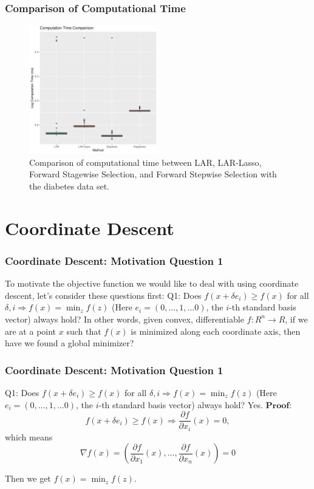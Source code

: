 \begin{frame}
    \frametitle{Comparison of Computational Time}
\begin{figure}[!htbp]
    \begin{center}
        \includegraphics[width=0.5\textwidth]{img/lars_time.pdf}
    \end{center}
    \caption{Comparison of computational time between LAR, LAR-Lasso, Forward Stagewise Selection, and Forward Stepwise Selection with the diabetes data set.}\label{fig:lars_time}
\end{figure}
\end{frame}


\section{Coordinate Descent}
\begin{frame}
    \frametitle{Coordinate Descent: Motivation Question 1}
To motivate the objective function we would like to deal with using coordinate descent, let's consider these questions first:
\newline\newline
Q1: Does $f\left(x+\delta e_i\right) \geq f(x)$ for all $\delta, i \Longrightarrow f(x)=\min _z f(z)$ (Here $e_i=(0, \ldots, 1, \ldots 0)$, the $i$-th standard basis vector) always hold?
\newline\newline
In other words, given convex, differentiable $f: R^n \rightarrow R$, if we are at a point $x$ such that $f(x)$ is minimized along each coordinate axis, then have we found a global minimizer?
\end{frame}

\begin{frame}
    \frametitle{Coordinate Descent: Motivation Question 1}
Q1: Does $f\left(x+\delta e_i\right) \geq f(x)$ for all $\delta, i \Longrightarrow f(x)=\min _z f(z)$ (Here $e_i=(0, \ldots, 1, \ldots 0)$, the $i$-th standard basis vector) always hold?
\newline\newline
Yes. $\textbf{Proof}$:
$$
f\left(x+\delta e_i\right) \geq f(x) \Longrightarrow \frac{\partial f}{\partial x_i}(x)=0,
$$
which means
$$
\nabla f(x)=\left(\frac{\partial f}{\partial x_1}(x), \ldots, \frac{\partial f}{\partial x_n}(x)\right)=0
$$

Then we get $f(x)=\min _z f(z)$.
\end{frame}

